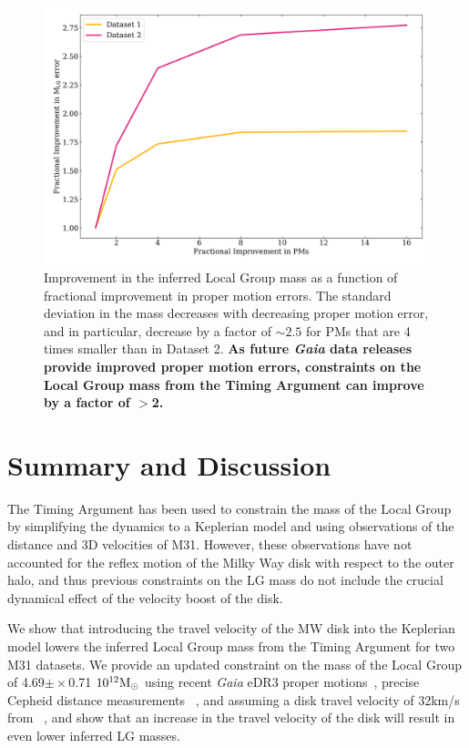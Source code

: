 \documentclass[twocolumn]{aastex631}
\begin{document}
\begin{figure}[htb]
    \centering
    \includegraphics[width=\columnwidth]{analyze-runs-deltaMvsPM.png}
    \caption{\label{fig:mvspm} Improvement in the inferred Local Group mass as a function of fractional improvement in proper motion errors. The standard deviation in the mass decreases with decreasing proper motion error, and in particular, decrease by a factor of $\sim2.5$ for PMs that are 4 times smaller than in Dataset 2. \textbf{As future \textit{Gaia} data releases provide improved proper motion errors, constraints on the Local Group mass from the Timing Argument can improve by a factor of $>$2.}
    }
\end{figure}

\section{Summary and Discussion}
\label{sec:discussion}
The Timing Argument has been used to constrain the mass of the Local Group by 
simplifying the dynamics to a Keplerian model and using observations of the 
distance and 3D velocities of M31. 
However, these observations have not accounted for the reflex motion of the 
Milky Way disk with respect to the outer halo, and thus previous constraints on 
the LG mass do not include the crucial dynamical effect of the velocity boost 
of the disk.

We show that introducing the travel velocity of the MW disk into the Keplerian 
model lowers the inferred Local Group mass from the Timing Argument for two M31 
datasets. 
We provide an updated constraint on the mass of the Local Group of 
4.69$\pm\times$0.71 $10^{12}\mathrm{M}_\odot$ using recent \textit{Gaia} eDR3 proper 
motions~\citep{Salomon2021}, precise Cepheid distance measurements
~\citep{Li2021}, and assuming a disk travel velocity of 32km/s from
~\cite{Petersen2021}, and show that an increase in the travel velocity of the 
disk will result in even lower inferred LG masses.
\end{document}
